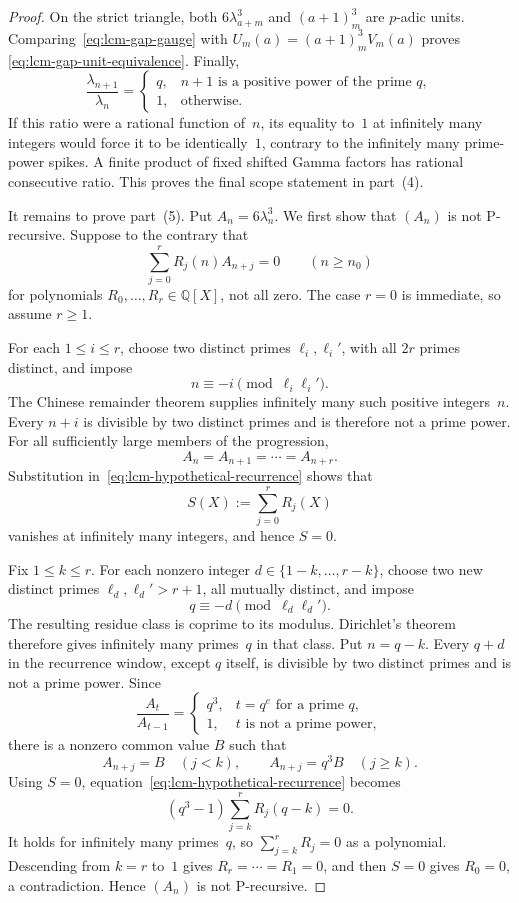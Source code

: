 \begin{proof}
On the strict triangle, both $6\lambda_{a+m}^3$ and $(a+1)_m^3$ are
$p$-adic units.  Comparing~\eqref{eq:lcm-gap-gauge} with
$U_m(a)=(a+1)_m^3V_m(a)$ proves
\eqref{eq:lcm-gap-unit-equivalence}.  Finally,
\[
 \frac{\lambda_{n+1}}{\lambda_n}
 =\begin{cases}
   q,&n+1\text{ is a positive power of the prime }q,\\
   1,&\text{otherwise}.
  \end{cases}
\]
If this ratio were a rational function of~$n$, its equality to~$1$ at
infinitely many integers would force it to be identically~$1$, contrary to
the infinitely many prime-power spikes.  A finite product of fixed shifted
Gamma factors has rational consecutive ratio.  This proves the final
scope statement in part~(4).

It remains to prove part~(5).  Put $A_n=6\lambda_n^3$.  We first show
that $(A_n)$ is not P-recursive.  Suppose to the contrary that
\begin{equation}
 \sum_{j=0}^r R_j(n)A_{n+j}=0
 \qquad(n\geq n_0)
 \label{eq:lcm-hypothetical-recurrence}
\end{equation}
for polynomials $R_0,\ldots,R_r\in\mathbb Q[X]$, not all zero.  The case
$r=0$ is immediate, so assume $r\geq1$.

For each $1\leq i\leq r$, choose two distinct primes
$\ell_i,\ell_i'$, with all $2r$ primes distinct, and impose
\[
 n\equiv-i\pmod{\ell_i\ell_i'}.
\]
The Chinese remainder theorem supplies infinitely many such positive
integers~$n$.  Every $n+i$ is divisible by two distinct primes and is
therefore not a prime power.  For all sufficiently large members of the
progression,
\[
 A_n=A_{n+1}=\cdots=A_{n+r}.
\]
Substitution in~\eqref{eq:lcm-hypothetical-recurrence} shows that
\[
 S(X):=\sum_{j=0}^rR_j(X)
\]
vanishes at infinitely many integers, and hence $S=0$.

Fix $1\leq k\leq r$.  For each nonzero integer
$d\in\{1-k,\ldots,r-k\}$, choose two new distinct primes
$\ell_d,\ell_d'>r+1$, all mutually distinct, and impose
\[
 q\equiv-d\pmod{\ell_d\ell_d'}.
\]
The resulting residue class is coprime to its modulus.  Dirichlet's theorem
therefore gives infinitely many primes~$q$ in that class.  Put $n=q-k$.
Every $q+d$ in the recurrence window, except $q$ itself, is divisible
by two distinct primes and is not a prime power.  Since
\[
 \frac{A_t}{A_{t-1}}=
 \begin{cases}
  q^3,&t=q^e\text{ for a prime }q,\\
  1,&t\text{ is not a prime power},
 \end{cases}
\]
there is a nonzero common value $B$ such that
\[
 A_{n+j}=B\quad(j<k),\qquad
 A_{n+j}=q^3B\quad(j\geq k).
\]
Using $S=0$, equation~\eqref{eq:lcm-hypothetical-recurrence} becomes
\[
 (q^3-1)\sum_{j=k}^rR_j(q-k)=0.
\]
It holds for infinitely many primes~$q$, so
$\sum_{j=k}^rR_j=0$ as a polynomial.  Descending from $k=r$ to~$1$
gives $R_r=\cdots=R_1=0$, and then $S=0$ gives $R_0=0$, a
contradiction.  Hence $(A_n)$ is not P-recursive.


\end{proof}
